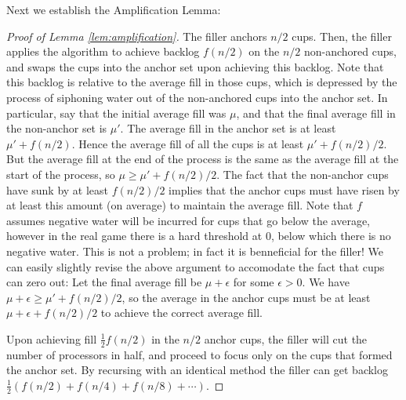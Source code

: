 \documentclass{article}[11pt]
\begin{document}
Next we establish the Amplification Lemma:
\begin{proof}[Proof of Lemma \ref{lem:amplification}]
  The filler anchors $n/2$ cups. Then, the filler applies the algorithm to
  achieve backlog $f(n/2)$ on the $n/2$ non-anchored cups, and swaps the cups
  into the anchor set upon achieving this backlog. Note that this backlog is
  relative to the average fill in those cups, which is depressed by the process
  of siphoning water out of the non-anchored cups into the anchor set. In
  particular, say that the initial average fill was $\mu$, and that the final
  average fill in the non-anchor set is $\mu'$. The average fill in the anchor
  set is at least $\mu' + f(n/2)$. Hence the average fill of all the cups is at
  least $\mu' + f(n/2)/2$. But the average fill at the end of the process is
  the same as the average fill at the start of the process, so $\mu \ge \mu' +
  f(n/2)/2$. The fact that the non-anchor cups have sunk by at least $f(n/2)/2$
  implies that the anchor cups must have risen by at least this amount (on
  average) to maintain the average fill. Note that $f$ assumes negative water
  will be incurred for cups that go below the average, however in the real game
  there is a hard threshold at $0$, below which there is no negative water.
  This is not a problem; in fact it is benneficial for the filler! We can
  easily slightly revise the above argument to accomodate the fact that cups
  can zero out: Let the final average fill be $\mu+\epsilon$ for some
  $\epsilon>0$. We have $\mu+\epsilon \ge \mu' + f(n/2)/2$, so the average in the
  anchor cups must be at least $\mu+\epsilon+f(n/2)/2$ to achieve the correct
  average fill.
  
  Upon achieving fill $\frac{1}{2}f(n/2)$ in the $n/2$ anchor cups, the filler
  will cut the number of processors in half, and proceed to focus only on the cups that 
  formed the anchor set. By recursing with an identical method the filler can
  get backlog $\frac{1}{2}(f(n/2) + f(n/4) + f(n/8) + \cdots)$.

\end{proof}
\end{document}

